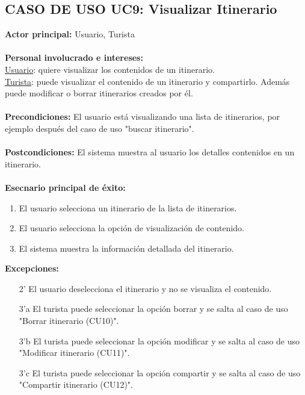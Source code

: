 \documentclass[12pt]{article}
\begin{document}
\subsection{\textbf{CASO DE USO UC9:} Visualizar Itinerario }
\textbf{Actor principal:} Usuario, Turista\\
\\
\textbf{Personal involucrado e intereses: }\\
\underline{Usuario}: quiere visualizar los contenidos de un itinerario.\\
\underline{Turista}: puede visualizar el contenido de un itinerario y compartirlo. Además puede modificar o borrar itinerarios creados por él.
\\\\
\textbf{Precondiciones:} El usuario está visualizando una lista de itinerarios, por ejemplo después del caso de uso "buscar itinerario".\\
\\
\textbf{Postcondiciones:} El sistema muestra al usuario los detalles contenidos en un itinerario.\\
\\
\textbf{Esecnario principal de éxito:}
\begin{enumerate}
\item El usuario selecciona un itinerario de la lista de itinerarios.
\item El usuario selecciona la opción de visualización de contenido.
\item El sistema muestra la información detallada del itinerario.
\end{enumerate}
\textbf{Excepciones:}
\begin{enumerate}
\item[2'] El usuario deselecciona el itinerario y no se visualiza el contenido.
\item[3'a] El turista puede seleccionar la opción borrar y se salta al caso de uso "Borrar itinerario (CU10)".
\item[3'b] El turista puede seleccionar la opción modificar y se salta al caso de uso "Modificar itinerario (CU11)".
\item[3'c] El turista puede seleccionar la opción compartir y se salta al caso de uso "Compartir itinerario (CU12)".
\end{enumerate}

\newpage
\end{document}
